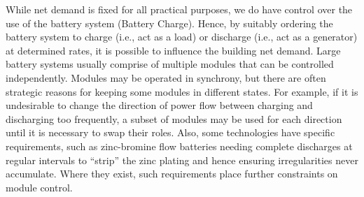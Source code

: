 While net demand is fixed for all practical purposes, we do have control over the use of the battery system (Battery Charge). Hence, by suitably ordering the battery system to charge (i.e., act as a load) or discharge (i.e., act as a generator) at determined rates, it is possible to influence the building net demand. 
Large battery systems usually comprise of multiple modules that can be controlled independently.  Modules may be operated in synchrony, but there are often strategic reasons for keeping some modules in different states.  For example, if it is undesirable to change the direction of power flow between charging and discharging too frequently, a subset of modules may be used for each direction until it is necessary to swap their roles. Also, some technologies have specific requirements, such as zinc-bromine flow batteries needing complete discharges at regular intervals to ``strip'' the zinc plating and hence ensuring irregularities never accumulate. Where they exist, such requirements place further constraints on module control.

